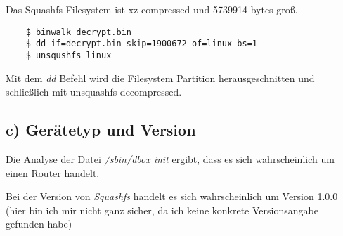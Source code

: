 Das Squashfs Filesystem ist xz compressed und 5739914 bytes groß.
\begin{lstlisting}
    $ binwalk decrypt.bin
    $ dd if=decrypt.bin skip=1900672 of=linux bs=1
    $ unsqushfs linux
\end{lstlisting}

Mit dem \textit{dd} Befehl wird die Filesystem Partition herausgeschnitten und schließlich mit unsquashfs decompressed.

\subsection*{c) Gerätetyp und Version}

Die Analyse der Datei \textit{/sbin/dbox init} ergibt, dass es sich wahrscheinlich um einen Router handelt.

Bei der Version von \textit{Squashfs} handelt es sich wahrscheinlich um Version 1.0.0 (hier bin ich mir nicht ganz sicher,
 da ich keine konkrete Versionsangabe gefunden habe)



